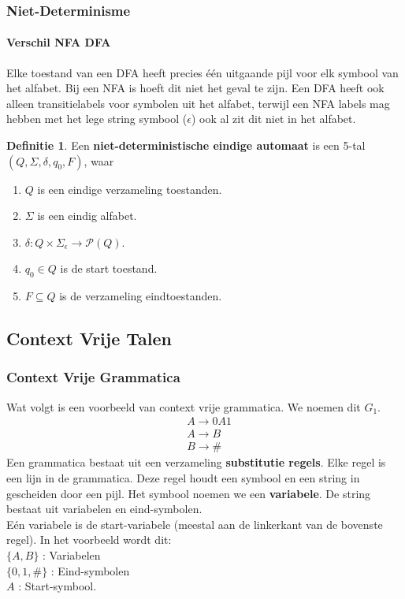 \documentclass[12pt,a4paper]{article}
\theoremstyle{definition}
\newtheorem{defi}{Definitie}[section]
\newcommand{\ra}{\ensuremath{\rightarrow}}
\newcommand{\NFA}{\ensuremath{(Q,\Sigma,\delta,q_0,F)}}
\begin{document}
	\subsubsection{Niet-Determinisme}
	\paragraph{Verschil NFA DFA}
	Elke toestand van een DFA heeft precies één uitgaande pijl voor elk symbool van het alfabet. Bij een NFA is hoeft dit niet het geval te zijn. Een DFA heeft ook alleen transitielabels voor symbolen uit het alfabet, terwijl een NFA labels mag hebben met het lege string symbool ($\epsilon$) ook al zit dit niet in het alfabet.
	\begin{defi}
		Een \textbf{niet-deterministische eindige automaat} is een 5-tal\\ $\NFA$, waar
		\begin{enumerate}
			\item $Q$ is een eindige verzameling toestanden.
			\item $\Sigma$ is een eindig alfabet.
			\item $\delta : Q\times \Sigma_\epsilon \ra \mathcal{P}(Q)$.
			\item $q_0 \in Q$ is de start toestand.
			\item $F \subseteq Q$ is de verzameling eindtoestanden.
		\end{enumerate}
	\end{defi}
	
\subsection{Context Vrije Talen}
\subsubsection{Context Vrije Grammatica}
Wat volgt is een voorbeeld van context vrije grammatica. We noemen dit $G_1$.
\begin{align*}
&A \rightarrow 0A1\\
&A \rightarrow B\\
&B \rightarrow \#
\end{align*}
Een grammatica bestaat uit een verzameling \textbf{substitutie regels}. Elke regel is een lijn in de grammatica. Deze regel houdt een symbool en een string in gescheiden door een pijl. Het symbool noemen we een \textbf{variabele}. De string bestaat uit variabelen en eind-symbolen.\\
Eén variabele is de start-variabele (meestal aan de linkerkant van de bovenste regel). In het voorbeeld wordt dit:\\
$\{A,B\}$ : Variabelen\\
$\{0,1,\#\}$ : Eind-symbolen\\
$A$ : Start-symbool.\\
\end{document}
